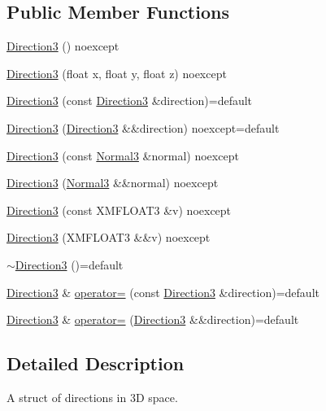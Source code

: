 \subsection*{Public Member Functions}
\begin{DoxyCompactItemize}
\item 
\hyperlink{structmage_1_1_direction3_a1c3d06aa13b207f86df36f5f3cfe486a}{Direction3} () noexcept
\item 
\hyperlink{structmage_1_1_direction3_a1af960df38637947de4ccc46aa668eb0}{Direction3} (float x, float y, float z) noexcept
\item 
\hyperlink{structmage_1_1_direction3_a1fd643f28a532720ad30cbf2ac90c5e9}{Direction3} (const \hyperlink{structmage_1_1_direction3}{Direction3} \&direction)=default
\item 
\hyperlink{structmage_1_1_direction3_a3852489e86ad55937e50aa17b15ccd05}{Direction3} (\hyperlink{structmage_1_1_direction3}{Direction3} \&\&direction) noexcept=default
\item 
\hyperlink{structmage_1_1_direction3_a3f4daf4fbf2e873bcf9133eca22fad34}{Direction3} (const \hyperlink{structmage_1_1_normal3}{Normal3} \&normal) noexcept
\item 
\hyperlink{structmage_1_1_direction3_ae9b26ed667537e7751b495058bb71de0}{Direction3} (\hyperlink{structmage_1_1_normal3}{Normal3} \&\&normal) noexcept
\item 
\hyperlink{structmage_1_1_direction3_a1230915b5196dfb1f453a612837f2cce}{Direction3} (const X\+M\+F\+L\+O\+A\+T3 \&v) noexcept
\item 
\hyperlink{structmage_1_1_direction3_a93492f00127daa470f69afaa08603759}{Direction3} (X\+M\+F\+L\+O\+A\+T3 \&\&v) noexcept
\item 
\hyperlink{structmage_1_1_direction3_a583c087dc366d206aaf54a33bc90c50b}{$\sim$\+Direction3} ()=default
\item 
\hyperlink{structmage_1_1_direction3}{Direction3} \& \hyperlink{structmage_1_1_direction3_a474a3c1ecf07954ff598933cef4f85f4}{operator=} (const \hyperlink{structmage_1_1_direction3}{Direction3} \&direction)=default
\item 
\hyperlink{structmage_1_1_direction3}{Direction3} \& \hyperlink{structmage_1_1_direction3_aac5690f3f40ba12f4e9eb09f5d2fb7f7}{operator=} (\hyperlink{structmage_1_1_direction3}{Direction3} \&\&direction)=default
\end{DoxyCompactItemize}


\subsection{Detailed Description}
A struct of directions in 3D space. 

